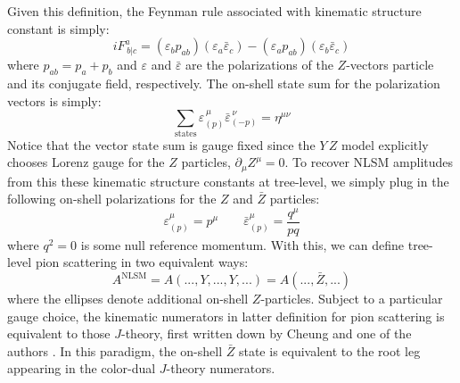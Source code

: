 \documentclass[11pt,letter]{article}
\def\be{\begin{equation}}
\begin{document}
Given this definition, the Feynman rule associated with kinematic structure constant is simply:
\be\label{eq:FeynmanRuleXZZ}
i F^{a}_{\,b|c} = (\varepsilon_b p_{ab})(\varepsilon_a\bar{\varepsilon}_c) - (\varepsilon_a p_{ab})(\varepsilon_b\bar{\varepsilon}_c) 
\end{equation}
where $p_{ab}=p_a+p_b$ and $\varepsilon$ and $\bar{\varepsilon}$ are the polarizations of the $Z$-vectors particle and its conjugate field, respectively. The on-shell state sum for the polarization vectors is simply:
\begin{equation}
\sum_{\text{states}} \varepsilon^{\,\mu}_{(p)}\bar{\varepsilon}^{\,\nu}_{(-p)} = \eta^{\mu\nu}
\end{equation}
Notice that the vector state sum is gauge fixed since the $Y\,Z$ model explicitly chooses Lorenz gauge for the $Z$ particles, $\partial_\mu Z^\mu=0$. To recover NLSM amplitudes from this these kinematic structure constants at tree-level, we simply plug in the following on-shell polarizations for the $Z$ and $\bar{Z}$ particles:
\be\label{eq:onShellZStates}
\varepsilon^\mu_{(p)} = p^\mu \qquad \bar{\varepsilon}^\mu_{(p)} = \frac{q^\mu}{pq}
\end{equation}
where $q^2=0$ is some null reference momentum. With this, we can define tree-level pion scattering in two equivalent ways:
\begin{equation}
A^{\text{NLSM}} = A(...,Y,...,Y,...) = A(...,\bar{Z},...) 
\end{equation}
where the ellipses denote additional on-shell $Z$-particles. Subject to a particular gauge choice, the kinematic numerators in latter definition for pion scattering is equivalent to those $J$-theory, first written down by Cheung and one of the authors \cite{Cheung:2021zvb}. In this paradigm, the on-shell $\bar{Z}$ state is equivalent to the root leg appearing in the color-dual $J$-theory numerators. 
\end{document}

